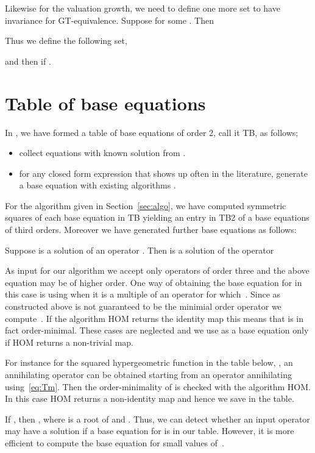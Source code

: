\documentclass{article}
\begin{document}
Likewise for the valuation growth, we need to define one more set to have invariance for GT-equivalence.
Suppose  for some . Then 



Thus we define the following set,

and then  if .



\section{Table of base equations}



In \cite{YC11, CHG10}, we have formed a table of base equations of order 2, call it TB, as follows;
\begin{itemize}
\item collect equations with known solution from \cite{abst, AG76}.
\item for any closed form expression that shows up often in the literature, generate a base equation with existing algorithms \cite{ChyzakDM, KoutschHF}.
\end{itemize}
For the algorithm given in Section~\ref{sec:algo}, we have computed symmetric squares of each base equation in TB yielding an entry in TB2 of a base equations of third orders.  Moreover we have generated further base equations as follows:

Suppose  is a solution of an operator .
Then  is a solution of the operator

As input for our algorithm we accept only operators of order three and the above equation
may be of higher order. One way of obtaining the base equation for  in this case
is using  when it is a multiple of an operator  for which~.
Since  as constructed above is not guaranteed to be the minimial order operator
we compute~. If the algorithm HOM returns the identity map this means
that  is in fact order-minimal. These cases are neglected and
we use  as a base equation only if HOM returns a non-trivial map.

For instance for the squared hypergeometric function in the table below,
, an annihilating
operator  can be obtained starting from an operator  annihilating
 using~\eqref{eq:Tm}.  Then
the order-minimality of  is checked with the algorithm HOM. In this case HOM returns
a non-identity map and hence we save  in the table.



If , then , where  is a root of
 and .  Thus, we can detect whether an
input operator may have a solution  if a base equation for  is in our table.
However, it is more efficient to compute the base equation for small values of~.
\end{document}
